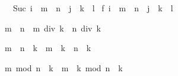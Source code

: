 \begin{isabellebody}
\begin{isamarkuptxt}%
\begin{isabelle}%
\ {}{}\ Suc\ {}i\ {}\ {}m\ {}\ n\ {}\ j\ {}\ {}k\ {}\ l{}{}{}\ {}\isanewline
{}f\ {}i\ {}\ {}m\ {}\ n\ {}\ j\ {}\ {}k\ {}\ l{}{}{}%
\end{isabelle}%
\end{isamarkuptxt}%
\isamarkuptrue%
\isamarkupfalse%
%
\endisatagproof
{\isafoldproof}%
%
\isadelimproof
%
\endisadelimproof
%
\begin{isamarkuptext}%
\begin{isabelle}%
m\ {}\ n\ {}\ m\ div\ k\ {}\ n\ div\ k%
\end{isabelle}

\begin{isabelle}%
{}m\ {}\ n{}\ {}\ k\ {}\ m\ {}\ k\ {}\ n\ {}\ k%
\end{isabelle}

\begin{isabelle}%
m\ mod\ n\ {}\ k\ {}\ m\ {}\ k\ mod\ {}n\ {}\ k{}%
\end{isabelle}


\end{isamarkuptext}
\end{isabellebody}
